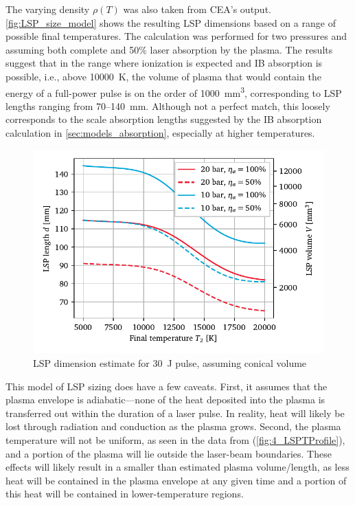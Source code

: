         The varying density $\rho(T)$ was also taken from CEA's output. \autoref{fig:LSP_size_model} shows the resulting LSP dimensions based on a range of possible final temperatures. The calculation was performed for two pressures and assuming both complete and 50\% laser absorption by the plasma. The results suggest that in the range where ionization is expected and IB absorption is possible, i.e., above \qty{10000}{K}, the volume of plasma that would contain the energy of a full-power pulse is on the order of 1000~\unit{mm^3}, corresponding to LSP lengths ranging from 70--\qty{140}{mm}. Although not a perfect match, this loosely corresponds to the scale absorption lengths suggested by the IB absorption calculation in \autoref{sec:models_absorption}, especially at higher temperatures.

        \begin{figure}[h]
            \centering
            \includegraphics[]{assets/4 models/volume_est.pdf}
            \caption{LSP dimension estimate for \qty{30}{J} pulse, assuming conical volume}
            \label{fig:LSP_size_model}
        \end{figure}

        This model of LSP sizing does have a few caveats. First, it assumes that the plasma envelope is adiabatic---none of the heat deposited into the plasma is transferred out within the duration of a laser pulse. In reality, heat will likely be lost through radiation and conduction as the plasma grows. Second, the plasma temperature will not be uniform, as seen in the data from \textcite{welleEnergyConversionEfficiency1986} (\autoref{fig:4_LSPTProfile}), and a portion of the plasma will lie outside the laser-beam boundaries. These effects will likely result in a smaller than estimated plasma volume/length, as less heat will be contained in the plasma envelope at any given time and a portion of this heat will be contained in lower-temperature regions.

